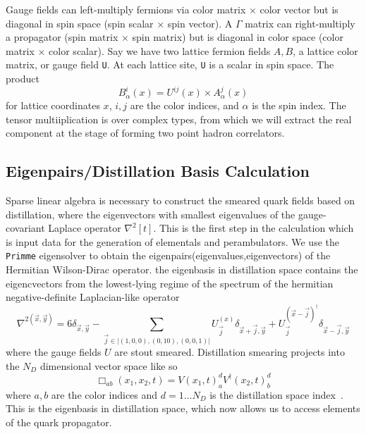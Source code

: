 Gauge fields can left-multiply fermions via color matrix $\times$ color vector but is diagonal in spin space (spin scalar $\times$ spin vector).
A $\Gamma$ matrix can right-multiply a propagator (spin matrix $\times$ spin matrix) but is diagonal in color space (color matrix $\times$ color
scalar). Say we have two lattice fermion fields $A, B$, a lattice color matrix, or gauge field \texttt{U}. At each lattice site, \texttt{U} is a scalar in spin space. The product 
\begin{equation}
  B_\alpha^i (x) = U^{ij}(x) \times A_\alpha^j(x)
\end{equation} for lattice coordinates $x$, $i,j$ are the color indices, and $\alpha$ is the spin index. The tensor multiiplication is over complex types, from which we will extract the real component at the stage of forming two point hadron correlators.  

  
\subsection{Eigenpairs/Distillation Basis Calculation}
Sparse linear algebra is necessary to construct the smeared quark fields based on distillation, where the
eigenvectors with smallest eigenvalues of the gauge-covariant Laplace operator $\nabla^2[t]$. 
This is the first step in the calculation which is input data for the generation of elementals and perambulators. We use the \verb|Primme| eigensolver to obtain the eigenpairs(eigenvalues,eigenvectors) of the Hermitian Wilson-Dirac operator\cite{PRIMME}\cite{Frommer:2020ovr}. 
the eigenbasis in distillation space contains the eigencvectors from the lowest-lying regime of the spectrum of the hermitian negative-definite Laplacian-like operator 
\begin{equation}
  \nabla^{2(\vec{x},\vec{y})} = 6\delta_{\vec{x},\vec{y}} - \sum_{\vec{j}\in|(1,0,0),(0,10),(0,0,1)|}^{} U_{\vec{j}}^{(x)}\delta_{\vec{x}+\vec{j},\vec{y}} + U_{\vec{j}}^{(\vec{x}-\vec{j})^\dagger}\delta_{\vec{x}-\vec{j},\vec{y}}
\end{equation}
where the gauge fields $U$ are stout smeared. 
Distillation smearing projects into the $N_D$ dimensional vector space like so 
\begin{equation}
  \Box_{ab}(x_1,x_2,t) = V(x_1,t)^{d}_a V^{\dagger} (x_2,t)^{d}_b
\end{equation} where $a,b$ are the color indices and $d = 1 \dots N_D$ is the distillation space index~\cite{10.5555/3029317}. This is the eigenbasis in distillation space, which now allows us to access elements of the quark propagator.  


